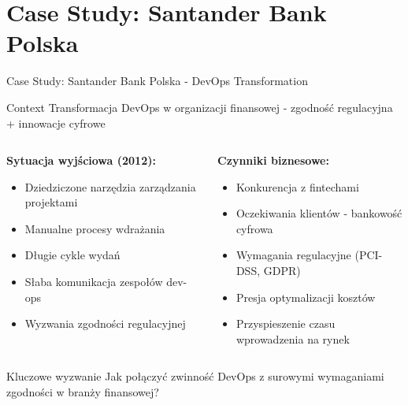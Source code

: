 \documentclass[10pt, aspectratio=169]{beamer}
\begin{document}
\section{Case Study: Santander Bank Polska}

\begin{frame}{Case Study: Santander Bank Polska - DevOps Transformation}
\begin{alertblock}{Context}
Transformacja DevOps w organizacji finansowej - zgodność regulacyjna + innowacje cyfrowe
\end{alertblock}

\begin{columns}[T]
\begin{column}{0.5\textwidth}
\textbf{Sytuacja wyjściowa (2012):}
\begin{itemize}
\item Dziedziczone narzędzia zarządzania projektami
\item Manualne procesy wdrażania  
\item Długie cykle wydań
\item Słaba komunikacja zespołów dev-ops
\item Wyzwania zgodności regulacyjnej
\end{itemize}
\end{column}
\begin{column}{0.5\textwidth}
\textbf{Czynniki biznesowe:}
\begin{itemize}
\item Konkurencja z fintechami
\item Oczekiwania klientów - bankowość cyfrowa
\item Wymagania regulacyjne (PCI-DSS, GDPR)
\item Presja optymalizacji kosztów
\item Przyspieszenie czasu wprowadzenia na rynek
\end{itemize}
\end{column}
\end{columns}

\begin{block}{Kluczowe wyzwanie}
Jak połączyć zwinność DevOps z surowymi wymaganiami zgodności w branży finansowej?
\end{block}
\end{frame}
\end{document}
